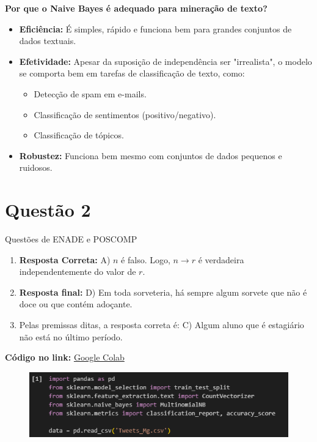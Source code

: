 \documentclass[12pt]{article}
\begin{document}
\textbf{Por que o Naive Bayes é adequado para mineração de texto?}
\begin{itemize}
    \item \textbf{Eficiência:} É simples, rápido e funciona bem para grandes conjuntos de dados textuais.
    \item \textbf{Efetividade:} Apesar da suposição de independência ser "irrealista", o modelo se comporta bem em tarefas de classificação de texto, como:
    \begin{itemize}
        \item Detecção de spam em e-mails.
        \item Classificação de sentimentos (positivo/negativo).
        \item Classificação de tópicos.
    \end{itemize}
    \item \textbf{Robustez:} Funciona bem mesmo com conjuntos de dados pequenos e ruidosos.
\end{itemize}

\section*{Questão 2}

Questões de ENADE e POSCOMP

\begin{enumerate}
    \item \textbf{Resposta Correta:} A) $n$ é falso. Logo, $n \to r$ é verdadeira independentemente do valor de $r$.
    \item \textbf{Resposta final:} D) Em toda sorveteria, há sempre algum sorvete que não é doce ou que contém adoçante.
    \item Pelas premissas ditas, a resposta correta é: C) Algum aluno que é estagiário não está no último período.
\end{enumerate}

\textbf{Código no link:} \href{https://colab.research.google.com/drive/1XJHAMNkPlEoEAqB5sWeKLu6-qzV9X_SO?usp=sharing}{Google Colab}

\begin{figure}[h]
	\centering
	\includegraphics[width=.8\textwidth]{image1.png}
\end{figure}
\end{document}
